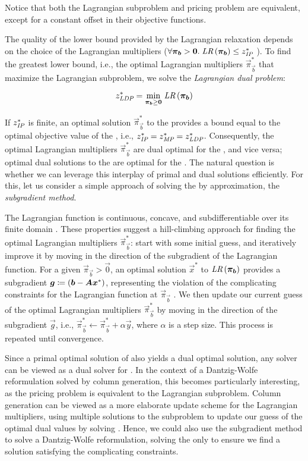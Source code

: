 Notice that both the Lagrangian subproblem and pricing problem are equivalent, except for a constant offset in their objective functions.

The quality of the lower bound provided by the Lagrangian relaxation depends on the choice of the Lagrangian multipliers ($\forall \vec{\pi}_\vec{b} > \vec{0}. \; \LR{\vec{\pi}_\vec{b}} \leq z^*_\IP{}$ \cite{thebook}). To find the greatest lower bound, i.e., the optimal Lagrangian multipliers $\vec{\pi}_\vec{b}^*$ that maximize the Lagrangian subproblem, we solve the \textit{Lagrangian dual problem}:

\begin{equation*}
z^*_\LDP{} = \underset{\vec{\pi}_\vec{b} \geq \vec{0}}{\min} \; \LR{\vec{\pi}_\vec{b}}
\end{equation*}

If $z^*_{\textit{IP}}{}$ is finite, an optimal solution $\vec{\pi}_\vec{b}^*$ to the \LDP{} provides a bound equal to the optimal objective value of the \MP{}, i.e., $z^*_{\textit{IP}}{} = z^*_{\textit{MP}}{} = z^*_{\textit{LDP}}{}$. Consequently, the optimal Lagrangian multipliers $\vec{\pi}_\vec{b}^*$ are dual optimal for the \MP{}, and vice versa; optimal dual solutions to the \MP{} are optimal for the \LDP{} \cite{thebook}. The natural question is whether we can leverage this interplay of primal and dual solutions efficiently. For this, let us consider a simple approach of solving the \LDP{} by approximation, the \textit{subgradient method}.

The Lagrangian function \LR{} is continuous, concave, and subdifferentiable over its finite domain \cite{thebook}. These properties suggest a hill-climbing approach for finding the optimal Lagrangian multipliers $\vec{\pi}_\vec{b}^*$: start with some initial guess, and iteratively improve it by moving in the direction of the subgradient of the Lagrangian function. For a given $\vec{\pi}_\vec{b} > \vec{0}$, an optimal solution $\vec{x}^*$ to $\LR{\vec{\pi}_\vec{b}}$ provides a subgradient ${\bm{g}} \coloneqq ({\bm{b}} - {\bm{A}} {\bm{x}}^*)$, representing the violation of the complicating constraints for the Lagrangian function at $\vec{\pi}_\vec{b}$ \cite{thebook}. We then update our current guess of the optimal Lagrangian multipliers $\vec{\pi}_\vec{b}^*$ by moving in the direction of the subgradient $\vec{g}$, i.e., $\vec{\pi}_\vec{b}^* \leftarrow \vec{\pi}_\vec{b}^* + \alpha \vec{y}$, where $\alpha$ is a step size. This process is repeated until convergence.

Since a primal optimal solution of \IP{} also yields a dual optimal solution, any \IP{} solver can be viewed as a dual solver for \LDP{}. In the context of a Dantzig-Wolfe reformulation solved by column generation, this becomes particularly interesting, as the pricing problem is equivalent to the Lagrangian subproblem. Column generation can be viewed as a more elaborate update scheme for the Lagrangian multipliers, using multiple solutions to the subproblem to update our guess of the optimal dual values by solving \MP{} \cite{thebook}. Hence, we could also use the subgradient method to solve a Dantzig-Wolfe reformulation, solving the \MP{} only to ensure we find a solution satisfying the complicating constraints.

